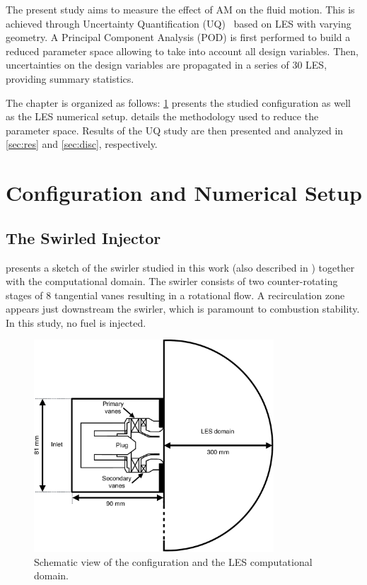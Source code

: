 The present study aims to measure the effect of AM on the fluid motion. This is achieved through Uncertainty Quantification (UQ)~\cite{Iooss2015a} based on LES with varying geometry. A Principal Component Analysis (POD) is first performed to build a reduced parameter space allowing to take into account all design variables. Then, uncertainties on the design variables are propagated in a series of 30 LES, providing summary statistics.

The chapter is organized as follows: \cref{sec:swirler} presents the studied configuration as well as the LES numerical setup.  details the methodology used to reduce the parameter space. Results of the UQ study are then presented and analyzed in  \cref{sec:res} and \cref{sec:disc}, respectively.

\section{Configuration and Numerical Setup}\label{sec:swirler}

\subsection{The Swirled Injector}

 presents a sketch of the swirler studied in this work (also described in \cite{Daviller2017}) together with the computational domain. The swirler consists of two counter-rotating stages of 8 tangential vanes resulting in a rotational flow. A recirculation zone appears just downstream the swirler, which is paramount to combustion stability. In this study, no fuel is injected.

\begin{figure}[!ht]
\centering
\includegraphics[width=0.8\textwidth,keepaspectratio]{fig/applications/swirler/swirler_UQ.pdf}
\caption{Schematic view of the configuration and the LES computational domain.}
\label{fig:scheme-swirler}
\end{figure}

